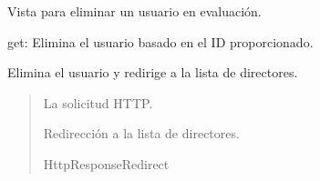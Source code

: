 \documentclass[letterpaper,10pt,spanish]{sphinxmanual}
\begin{document}
\begin{fulllineitems}

\pysigstartsignatures
{}
\pysigstopsignatures
\sphinxAtStartPar
Vista para eliminar un usuario en evaluación.
\begin{description}
\sphinxAtStartPar
get: Elimina el usuario basado en el ID proporcionado.

\end{description}


\begin{fulllineitems}

\pysigstartsignatures
{}
\pysigstopsignatures
\sphinxAtStartPar
Elimina el usuario y redirige a la lista de directores.
\begin{quote}\begin{description}
\sphinxAtStartPar
{} \textendash{} La solicitud HTTP.

\sphinxAtStartPar
Redirección a la lista de directores.

\sphinxAtStartPar
HttpResponseRedirect

\end{description}\end{quote}

\end{fulllineitems}


\end{fulllineitems}



\begin{fulllineitems}

\pysigstartsignatures
{}
\pysigstopsignatures
\end{fulllineitems}
\end{document}
